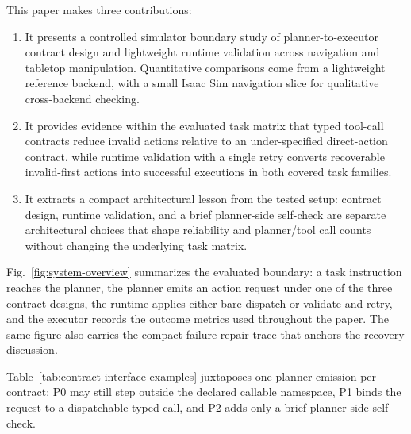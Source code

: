 This paper makes three contributions:

\begin{enumerate}
\item It presents a controlled simulator boundary study of
planner-to-executor contract design and lightweight runtime validation
across navigation and tabletop manipulation. Quantitative comparisons come
from a lightweight reference backend, with a small Isaac Sim navigation
slice for qualitative cross-backend checking.
\item It provides evidence within the evaluated task matrix that typed
tool-call contracts reduce invalid actions relative to an under-specified
direct-action contract, while runtime validation with a single retry
converts recoverable invalid-first actions into successful executions in
both covered task families.
\item It extracts a compact architectural lesson from the tested setup:
contract design, runtime validation, and a brief planner-side
self-check are separate architectural choices that shape reliability and
planner/tool call counts without changing the underlying task matrix.
\end{enumerate}

Fig.~\ref{fig:system-overview} summarizes the evaluated boundary: a task
instruction reaches the planner, the planner emits an action request under one
of the three contract designs, the runtime applies either bare dispatch or
validate-and-retry, and the executor records the outcome metrics used
throughout the paper. The same figure also carries the compact failure-repair
trace that anchors the recovery discussion.



Table~\ref{tab:contract-interface-examples} juxtaposes one planner
emission per contract: P0 may still step outside the declared callable
namespace, P1 binds the request to a dispatchable typed call, and P2 adds only
a brief planner-side self-check.


